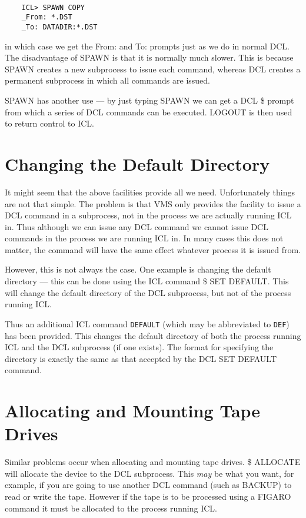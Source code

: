 \begin{verbatim}

    ICL> SPAWN COPY
    _From: *.DST
    _To: DATADIR:*.DST

\end{verbatim}
in which case we get the From: and To: prompts just as we do in normal DCL.
The disadvantage of SPAWN is that it is normally much slower. This is because
SPAWN creates a new subprocess to issue each command, whereas DCL creates
a permanent subprocess in which all commands are issued.

SPAWN has another use --- by just typing SPAWN we can get a DCL \$ prompt
from which a series of DCL commands can be executed. LOGOUT is then used
to return control to ICL.

\section{Changing the Default Directory}
It might seem that the above facilities provide all we need. Unfortunately
things are not that simple. The problem is that VMS only provides the facility
to issue a DCL command in a subprocess, not in the process we are actually
running ICL in. Thus although we can issue any DCL command we cannot issue
DCL commands in the process we are running ICL in. In many cases this does not
matter, the command will have the same effect whatever process it is issued
from.

However, this is not always the case. One example is changing the default
directory --- this can be done using the ICL command \$ SET DEFAULT. This 
will change the default directory of the DCL subprocess, but not of the 
process running ICL.

Thus an additional ICL command \verb+DEFAULT+ (which may be abbreviated
to \verb+DEF+) has been provided. This changes the default directory of
both the process running ICL and the DCL subprocess (if one exists). The
format for specifying the directory is exactly the same as that accepted
by the DCL SET DEFAULT command.

\section{Allocating and Mounting Tape Drives}
Similar problems occur when allocating and mounting tape drives. 
\$ ALLOCATE will allocate the device to the DCL subprocess. This {\em may}
be what you want, for example, if you are going to use another DCL
command (such as BACKUP) to read or write the tape. However if the tape
is to be processed using a FIGARO command it must be allocated to the
process running ICL.

